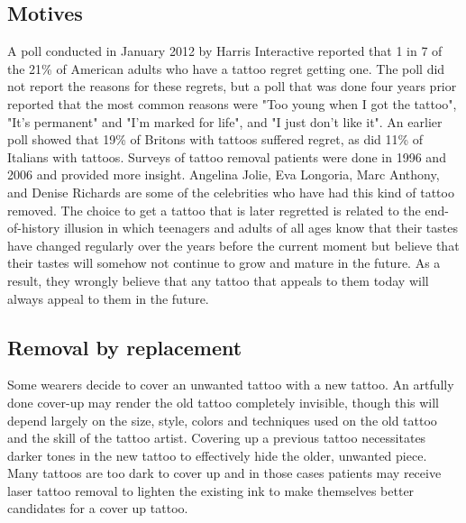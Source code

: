 \documentclass[12pt]{article}
\begin{document}
\subsection{Motives}
A poll conducted in January 2012 by Harris Interactive reported that 1 in 7 of the 21\% of American adults who have a tattoo regret getting one.
The poll did not report the reasons for these regrets, but a poll that was done four years prior reported that the most common reasons were "Too young when I got the tattoo", "It's permanent" and "I'm marked for life", and "I just don't like it".
An earlier poll showed that 19\% of Britons with tattoos suffered regret, as did 11\% of Italians with tattoos.
Surveys of tattoo removal patients were done in 1996 and 2006 and provided more insight.
Angelina Jolie, Eva Longoria, Marc Anthony, and Denise Richards are some of the celebrities who have had this kind of tattoo removed.
The choice to get a tattoo that is later regretted is related to the end-of-history illusion in which teenagers and adults of all ages know that their tastes have changed regularly over the years before the current moment but believe that their tastes will somehow not continue to grow and mature in the future.
As a result, they wrongly believe that any tattoo that appeals to them today will always appeal to them in the future.

\subsection{Removal by replacement}
Some wearers decide to cover an unwanted tattoo with a new tattoo.
An artfully done cover-up may render the old tattoo completely invisible, though this will depend largely on the size, style, colors and techniques used on the old tattoo and the skill of the tattoo artist.
Covering up a previous tattoo necessitates darker tones in the new tattoo to effectively hide the older, unwanted piece.
Many tattoos are too dark to cover up and in those cases patients may receive laser tattoo removal to lighten the existing ink to make themselves better candidates for a cover up tattoo.
\end{document}
